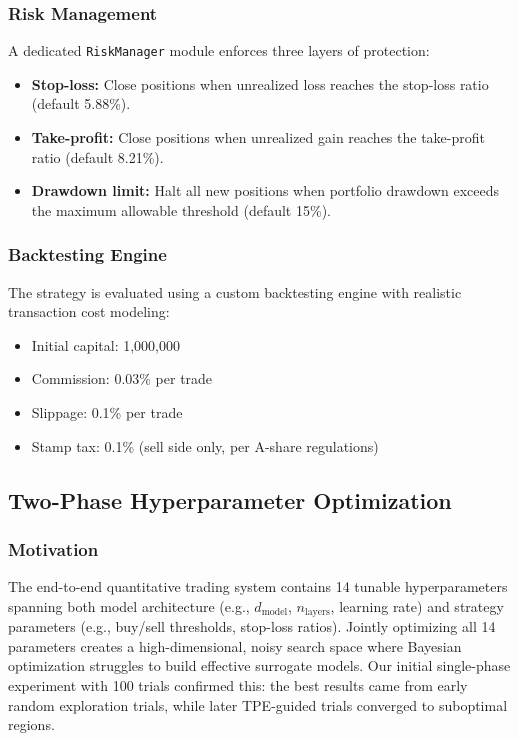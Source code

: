 \documentclass[12pt, a4paper]{article}
\begin{document}
\subsubsection{Risk Management}

A dedicated \texttt{RiskManager} module enforces three layers of protection:
\begin{itemize}[leftmargin=2em]
    \item \textbf{Stop-loss:} Close positions when unrealized loss reaches the stop-loss ratio (default 5.88\%).
    \item \textbf{Take-profit:} Close positions when unrealized gain reaches the take-profit ratio (default 8.21\%).
    \item \textbf{Drawdown limit:} Halt all new positions when portfolio drawdown exceeds the maximum allowable threshold (default 15\%).
\end{itemize}

\subsubsection{Backtesting Engine}

The strategy is evaluated using a custom backtesting engine with realistic transaction cost modeling:
\begin{itemize}[leftmargin=2em]
    \item Initial capital: \textyen{}1,000,000
    \item Commission: 0.03\% per trade
    \item Slippage: 0.1\% per trade
    \item Stamp tax: 0.1\% (sell side only, per A-share regulations)
\end{itemize}

\subsection{Two-Phase Hyperparameter Optimization} \label{sec:optuna}

\subsubsection{Motivation}

The end-to-end quantitative trading system contains 14 tunable hyperparameters spanning both model architecture (e.g., $d_{\text{model}}$, $n_{\text{layers}}$, learning rate) and strategy parameters (e.g., buy/sell thresholds, stop-loss ratios). Jointly optimizing all 14 parameters creates a high-dimensional, noisy search space where Bayesian optimization struggles to build effective surrogate models. Our initial single-phase experiment with 100 trials confirmed this: the best results came from early random exploration trials, while later TPE-guided trials converged to suboptimal regions.
\end{document}
